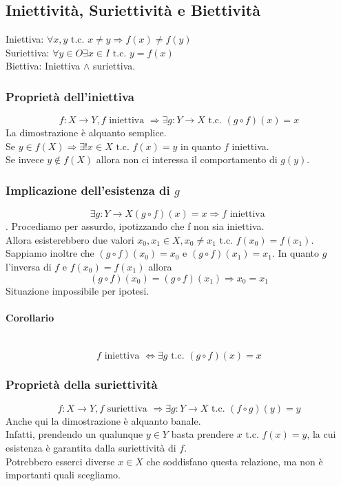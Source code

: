 \documentclass{report}
\newcommand{\subsubsubsection}[1]{\paragraph{#1}\mbox{}\\}
\begin{document}
    \subsection{Iniettività, Suriettività e Biettività}
        Iniettiva: $\forall x,y \textrm{ t.c. } x \neq y \Longrightarrow f\left(x\right) \neq f\left(y\right)$ \\
        Suriettiva: $\forall y \in O \exists x \in I \textrm{ t.c. } y = f\left(x\right)$ \\
        Biettiva: Iniettiva $\wedge$ suriettiva.
        \subsubsection{Proprietà dell'iniettiva}
            $$f: X \longrightarrow Y, f \textrm{ iniettiva } \Longrightarrow \exists g: Y \longrightarrow X \textrm{ t.c. } \left(g \circ f\right)\left(x\right) = x$$
            La dimostrazione è alquanto semplice. \\
            Se $y \in f\left(X\right) \Longrightarrow \exists! x \in X \textrm{ t.c. } f\left(x\right) = y$ in quanto $f$ iniettiva. \\
            Se invece $y \notin f\left(X\right)$ allora non ci interessa il comportamento di $g\left(y\right)$.
        \subsubsection{Implicazione dell'esistenza di $g$}
            $$\exists g: Y \longrightarrow X \left(g \circ f\right)\left(x\right) = x \Longrightarrow f \textrm{ iniettiva }$$.
            Procediamo per assurdo, ipotizzando che f non sia iniettiva. \\
            Allora esisterebbero due valori $x_0, x_1 \in X, x_0 \neq x_1 \textrm{ t.c. } f\left(x_0\right) = f\left(x_1\right)$.
            Sappiamo inoltre che $\left(g\circ f\right)\left(x_0\right) = x_0$ e $\left(g \circ f\right)\left(x_1\right) = x_1$.
            In quanto $g$ l'inversa di $f$ e $f\left(x_0\right) = f\left(x_1\right)$ allora 
            $$\left(g\circ f\right)\left(x_0\right) = \left(g \circ f\right)\left(x_1\right) \Longrightarrow x_0 = x_1$$
            Situazione impossibile per ipotesi.
            \subsubsubsection{Corollario}
                $$f \textrm{ iniettiva } \Longleftrightarrow \exists g \textrm{ t.c. } \left(g \circ f\right)\left(x\right) = x$$
        \subsubsection{Proprietà della suriettività}
            $$f: X \longrightarrow Y, f \textrm{ suriettiva } \Longrightarrow \exists g: Y \longrightarrow X \textrm{ t.c. } \left(f \circ g\right)\left(y\right) = y$$
            Anche qui la dimostrazione è alquanto banale. \\
            Infatti, prendendo un qualunque $y \in Y$ basta prendere $x \textrm{ t.c. } f\left(x\right) = y$, la cui esistenza è garantita dalla suriettività di $f$. \\
            Potrebbero esserci diverse $x \in X$ che soddisfano questa relazione, ma non è importanti quali scegliamo.
\end{document}
